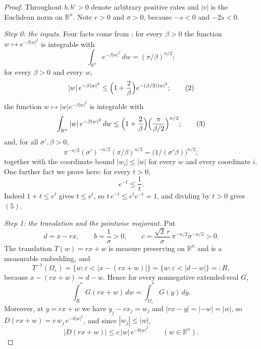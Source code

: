 \begin{proof}
Throughout $b, b' > 0$ denote arbitrary positive rates and $|v|$ is the Euclidean
norm on $\mathbb{R}^n$.  Note $r > 0$ and $\sigma > 0$, because $-s < 0$ and
$-2s < 0$.

\emph{Step 0: the inputs.}
Four facts come from : for every $\beta > 0$
the function $w \mapsto e^{-\beta|w|^2}$ is integrable with
\begin{equation*}
  \int_{\mathbb{R}^n} e^{-\beta|w|^2}\,dw = (\pi/\beta)^{n/2} ; \tag{1}
\end{equation*}
for every $\beta > 0$ and every $w$,
\begin{equation*}
  |w|\,e^{-\beta|w|^2} \leq \Bigl(1+\frac2\beta\Bigr)e^{-(\beta/2)|w|^2} ; \tag{2}
\end{equation*}
the function $w \mapsto |w|e^{-\beta|w|^2}$ is integrable with
\begin{equation*}
  \int_{\mathbb{R}^n}|w|\,e^{-\beta|w|^2}\,dw
    \leq \Bigl(1+\frac2\beta\Bigr)\Bigl(\frac{\pi}{\beta/2}\Bigr)^{n/2} ; \tag{3}
\end{equation*}
and, for all $\sigma', \beta > 0$,
\begin{equation*}
  \pi^{-n/2}(\sigma')^{-n/2}(\pi/\beta)^{n/2}
    = \bigl(1/(\sigma'\beta)\bigr)^{n/2} ; \tag{4}
\end{equation*}
together with the coordinate bound $|w_i| \leq |w|$ for every $w$ and every
coordinate $i$.  One further fact we prove here: for every $t > 0$,
\begin{equation*}
  e^{-t} \leq \frac1t . \tag{5}
\end{equation*}
Indeed $1 + t \leq e^t$ gives $t \leq e^t$, so
$t\,e^{-t} \leq e^t e^{-t} = 1$, and dividing by $t > 0$ gives $(5)$.

\emph{Step 1: the translation and the pointwise majorant.}
Put
\[
  d = x - rx , \qquad b = \frac1\sigma > 0 ,
  \qquad c = \frac{\sqrt2\,r}{\sigma}\,\pi^{-n/2}\sigma^{-n/2} > 0 .
\]
The translation $T(w) = rx+w$ is measure preserving on $\mathbb{R}^n$ and is a
measurable embedding, and
\[
  T^{-1}(\Omega_\varepsilon)
    = \{w : \varepsilon < |x-(rx+w)|\} = \{w : \varepsilon < |d-w|\} =: R ,
\]
because $x - (rx+w) = d-w$.  Hence for every nonnegative extended-real $G$,
\begin{equation*}
  \int^*_{R} G(rx+w)\,dw = \int^*_{\Omega_\varepsilon} G(y)\,dy . \tag{6}
\end{equation*}
Moreover, at $y = rx+w$ we have $y_j - rx_j = w_j$ and $|rx-y| = |{-w}| = |w|$,
so $D(rx+w) = c\,w_j\,e^{-b|w|^2}$, and since $|w_j| \leq |w|$,
\begin{equation*}
  \bigl|D(rx+w)\bigr| \leq c\,|w|\,e^{-b|w|^2}
  \qquad (w \in \mathbb{R}^n) . \tag{7}
\end{equation*}


\end{proof}
